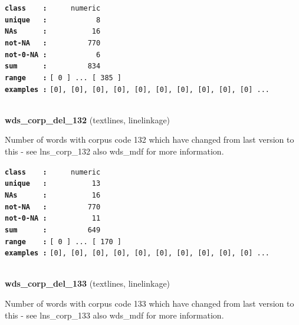 \documentclass[]{article}
\begin{document}
\textbf{\texttt{class\ \ \ \ :}} \texttt{~~~~~numeric}\\
\textbf{\texttt{unique\ \ \ :}} \texttt{~~~~~~~~~~~8}\\
\textbf{\texttt{NAs\ \ \ \ \ \ :}} \texttt{~~~~~~~~~~16}\\
\textbf{\texttt{not-NA\ \ \ :}} \texttt{~~~~~~~~~770}\\
\textbf{\texttt{not-0-NA\ :}} \texttt{~~~~~~~~~~~6}\\
\textbf{\texttt{sum\ \ \ \ \ \ :}} \texttt{~~~~~~~~~834}\\
\textbf{\texttt{range\ \ \ \ :}}
\texttt{{[}\ 0\ {]}\ ...\ {[}\ 385\ {]}}\\
\textbf{\texttt{examples\ :}}
\texttt{{[}0{]},\ {[}0{]},\ {[}0{]},\ {[}0{]},\ {[}0{]},\ {[}0{]},\ {[}0{]},\ {[}0{]},\ {[}0{]},\ {[}0{]}\ ...}\\

~

\textbf{wds\_corp\_del\_132} (textlines, linelinkage)

Number of words with corpus code 132 which have changed from last
version to this - see lns\_corp\_132 also wds\_mdf for more information.

\textbf{\texttt{class\ \ \ \ :}} \texttt{~~~~~numeric}\\
\textbf{\texttt{unique\ \ \ :}} \texttt{~~~~~~~~~~13}\\
\textbf{\texttt{NAs\ \ \ \ \ \ :}} \texttt{~~~~~~~~~~16}\\
\textbf{\texttt{not-NA\ \ \ :}} \texttt{~~~~~~~~~770}\\
\textbf{\texttt{not-0-NA\ :}} \texttt{~~~~~~~~~~11}\\
\textbf{\texttt{sum\ \ \ \ \ \ :}} \texttt{~~~~~~~~~649}\\
\textbf{\texttt{range\ \ \ \ :}}
\texttt{{[}\ 0\ {]}\ ...\ {[}\ 170\ {]}}\\
\textbf{\texttt{examples\ :}}
\texttt{{[}0{]},\ {[}0{]},\ {[}0{]},\ {[}0{]},\ {[}0{]},\ {[}0{]},\ {[}0{]},\ {[}0{]},\ {[}0{]},\ {[}0{]}\ ...}\\

~

\textbf{wds\_corp\_del\_133} (textlines, linelinkage)

Number of words with corpus code 133 which have changed from last
version to this - see lns\_corp\_133 also wds\_mdf for more information.
\end{document}
